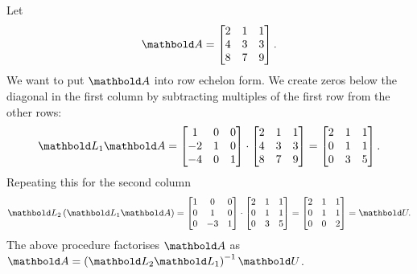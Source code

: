 \begin{example}
    Let
    \[
        \mat{A} =
        \begin{bmatrix}
            2	&	1	&	1	\\
            4	&	3	&	3	\\
            8	&	7	&	9	\\
        \end{bmatrix}.
    \]
    We want to put $\mat{A}$ into row echelon form. 
    We create zeros below the diagonal in the first column by subtracting multiples of the first row from the other rows:
    \[
        \mat{L}_1 \mat{A} =
        \begin{bmatrix}
            1		&	0	&	0	\\
            -2	&	1	&	0	\\
            -4	&	0	&	1	\\
        \end{bmatrix}
        \cdot
        \begin{bmatrix}
            2	&	1	&	1	\\
            4	&	3	&	3	\\
            8	&	7	&	9	\\
        \end{bmatrix}
        =
        \begin{bmatrix}
            2	&	1	&	1	\\
            0	&	1	&	1	\\
            0	&	3	&	5	\\
        \end{bmatrix}.
    \]
    Repeating this for the second column
    \[
        \mat{L}_2\left(\mat{L}_1 \mat{A}\right) =
        \begin{bmatrix}
            1	&	0		&	0	\\
            0	&	1		&	0	\\
            0	&	-3	&	1	\\
        \end{bmatrix}
        \cdot
        \begin{bmatrix}
            2	&	1	&	1	\\
            0	&	1	&	1	\\
            0	&	3	&	5	\\
        \end{bmatrix}
        =
        \begin{bmatrix}
            2	&	1	&	1	\\
            0	&	1	&	1	\\
            0	&	0	&	2	\\
        \end{bmatrix}
        = \mat{U}.
    \]
    The above procedure factorises $\mat{A}$ as $\mat{A} = \left( \mat{L}_2\mat{L}_1 \right)^{-1}\mat{U}$.
\end{example}

